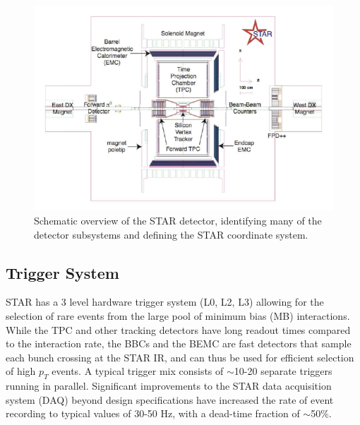 \begin{figure}
  \includegraphics[width=1.0\textwidth]{figures/star-schematic}
  \caption{Schematic overview of the STAR detector, identifying many of the detector subsystems and defining the STAR coordinate system.}
  \label{fig:star-schematic}
\end{figure}

\subsection{Trigger System}

STAR has a 3 level hardware trigger system (L0, L2, L3) \cite{Bieser:2002ah, Adler:2002ab} allowing for the selection of rare events from the large pool of minimum bias (MB) interactions.   While the TPC and other tracking detectors have long readout times compared to the interaction rate, the BBCs and the BEMC are fast detectors that sample each bunch crossing at the STAR IR, and can thus be used for efficient selection of high $p_T$ events.  A typical trigger mix consists of $\sim$10-20 separate triggers running in parallel.  Significant improvements to the STAR data acquisition system (DAQ) beyond design specifications have increased the rate of event recording to typical values of 30-50 Hz, with a dead-time fraction of $\sim$50\%.

